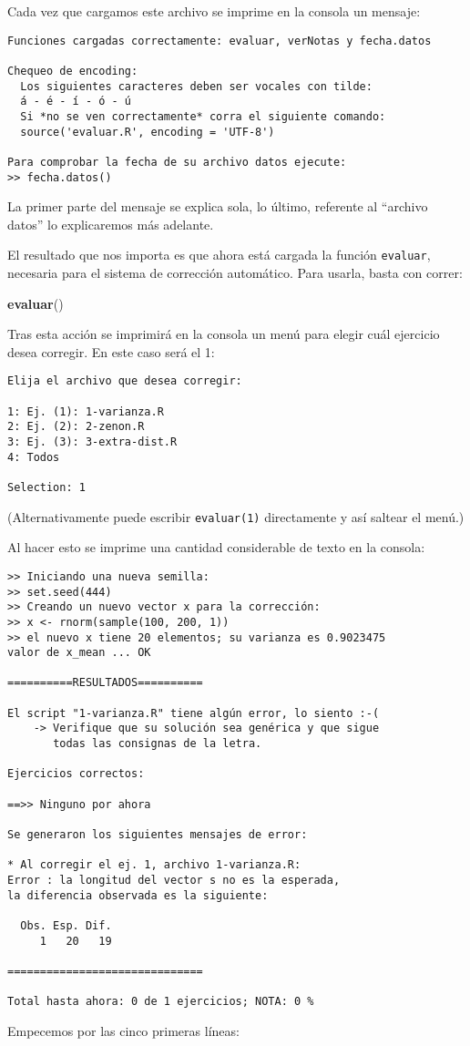 \documentclass[]{article}
\newenvironment{Shaded}{}{}
\newcommand{\KeywordTok}[1]{\textcolor[rgb]{0.00,0.44,0.13}{\textbf{{#1}}}}
\newcommand{\NormalTok}[1]{{#1}}
\begin{document}
Cada vez que cargamos este archivo se imprime en la consola un mensaje:

\begin{verbatim}
Funciones cargadas correctamente: evaluar, verNotas y fecha.datos

Chequeo de encoding:
  Los siguientes caracteres deben ser vocales con tilde:
  á - é - í - ó - ú
  Si *no se ven correctamente* corra el siguiente comando:
  source('evaluar.R', encoding = 'UTF-8')

Para comprobar la fecha de su archivo datos ejecute:
>> fecha.datos()
\end{verbatim}
La primer parte del mensaje se explica sola, lo último, referente al
``archivo datos'' lo explicaremos más adelante.

El resultado que nos importa es que ahora está cargada la función
\texttt{evaluar}, necesaria para el sistema de corrección automático.
Para usarla, basta con correr:

\begin{Shaded}
\begin{Highlighting}[]
\KeywordTok{evaluar}\NormalTok{()}
\end{Highlighting}
\end{Shaded}
Tras esta acción se imprimirá en la consola un menú para elegir cuál
ejercicio desea corregir. En este caso será el 1:

\begin{verbatim}
Elija el archivo que desea corregir: 

1: Ej. (1): 1-varianza.R
2: Ej. (2): 2-zenon.R
3: Ej. (3): 3-extra-dist.R
4: Todos

Selection: 1
\end{verbatim}
(Alternativamente puede escribir \texttt{evaluar(1)} directamente y así
saltear el menú.)

Al hacer esto se imprime una cantidad considerable de texto en la
consola:

\begin{verbatim}
>> Iniciando una nueva semilla:
>> set.seed(444)
>> Creando un nuevo vector x para la corrección:
>> x <- rnorm(sample(100, 200, 1))
>> el nuevo x tiene 20 elementos; su varianza es 0.9023475
valor de x_mean ... OK

==========RESULTADOS==========

El script "1-varianza.R" tiene algún error, lo siento :-(
    -> Verifique que su solución sea genérica y que sigue
       todas las consignas de la letra. 

Ejercicios correctos:

==>> Ninguno por ahora

Se generaron los siguientes mensajes de error:

* Al corregir el ej. 1, archivo 1-varianza.R:
Error : la longitud del vector s no es la esperada,
la diferencia observada es la siguiente:

  Obs. Esp. Dif. 
     1   20   19 

==============================

Total hasta ahora: 0 de 1 ejercicios; NOTA: 0 % 
\end{verbatim}
Empecemos por las cinco primeras líneas:
\end{document}
